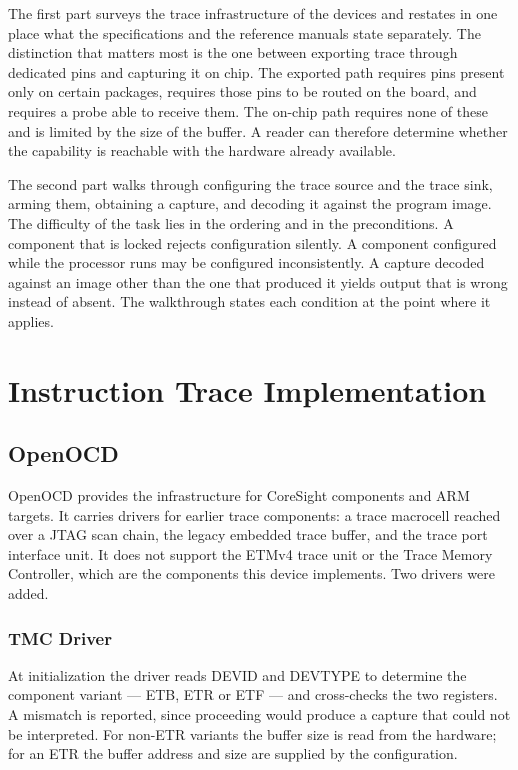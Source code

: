 The first part surveys the trace infrastructure of the devices and restates in one place what the specifications and the reference manuals state separately. The distinction that matters most is the one between exporting trace through dedicated pins and capturing it on chip. The exported path requires pins present only on certain packages, requires those pins to be routed on the board, and requires a probe able to receive them. The on-chip path requires none of these and is limited by the size of the buffer. A reader can therefore determine whether the capability is reachable with the hardware already available.

The second part walks through configuring the trace source and the trace sink, arming them, obtaining a capture, and decoding it against the program image. The difficulty of the task lies in the ordering and in the preconditions. A component that is locked rejects configuration silently. A component configured while the processor runs may be configured inconsistently. A capture decoded against an image other than the one that produced it yields output that is wrong instead of absent. The walkthrough states each condition at the point where it applies.

\section{Instruction Trace Implementation}
\label{sec:trace_impl}

\subsection{OpenOCD}
\label{subsec:drivers}
OpenOCD provides the infrastructure for CoreSight components and ARM targets. It carries drivers for earlier trace components: a trace macrocell reached over a JTAG scan chain, the legacy embedded trace buffer, and the trace port interface unit. It does not support the ETMv4 trace unit or the Trace Memory Controller, which are the components this device implements. Two drivers were added.

\subsubsection{TMC Driver}
At initialization the driver reads DEVID and DEVTYPE to determine the component variant --- ETB, ETR or ETF --- and cross-checks the two registers. A mismatch is reported, since proceeding would produce a capture that could not be interpreted. For non-ETR variants the buffer size is read from the hardware; for an ETR the buffer address and size are supplied by the configuration.

